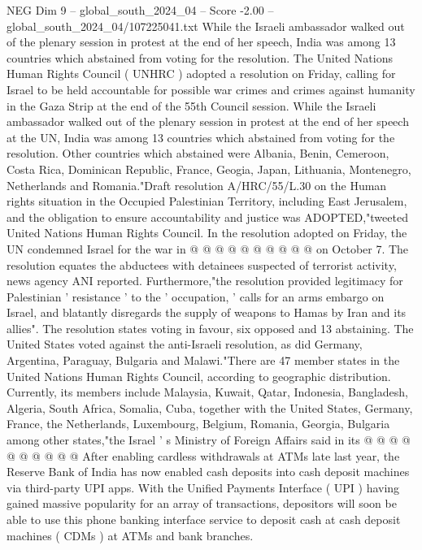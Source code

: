 \begin{textsample}{NEG Dim 9 – global\_south\_2024\_04 – Score -2.00 – global\_south\_2024\_04/107225041.txt}  \label{ex:f9_neg_376}
While the Israeli ambassador walked out of the plenary session in protest at the end of her speech, India was among 13 countries which abstained from voting for the resolution.
The United Nations Human Rights Council ( UNHRC ) adopted a resolution on Friday, calling for Israel to be held accountable for possible war crimes and crimes against humanity in the Gaza Strip at the end of the 55th Council session.
While the Israeli ambassador walked out of the plenary session in protest at the end of her speech at the UN, India was among 13 countries which abstained from voting for the resolution.
Other countries which abstained were Albania, Benin, Cemeroon, Costa Rica, Dominican Republic, France, Geogia, Japan, Lithuania, Montenegro, Netherlands and Romania."Draft resolution A/HRC/55/L.30 on the Human rights situation in the Occupied Palestinian Territory, including East Jerusalem, and the obligation to ensure accountability and justice was ADOPTED,"tweeted United Nations Human Rights Council.
In the resolution adopted on Friday, the UN condemned Israel for the war in @ @ @ @ @ @ @ @ @ @ on October 7.
The resolution equates the abductees with detainees suspected of terrorist activity, news agency ANI reported.
Furthermore,"the resolution provided legitimacy for Palestinian ' resistance ' to the ' occupation, ' calls for an arms embargo on Israel, and blatantly disregards the supply of weapons to Hamas by Iran and its allies".
The resolution states voting in favour, six opposed and 13 abstaining.
The United States voted against the anti-Israeli resolution, as did Germany, Argentina, Paraguay, Bulgaria and Malawi."There are 47 member states in the United Nations Human Rights Council, according to geographic distribution.
Currently, its members include Malaysia, Kuwait, Qatar, Indonesia, Bangladesh, Algeria, South Africa, Somalia, Cuba, together with the United States, Germany, France, the Netherlands, Luxembourg, Belgium, Romania, Georgia, Bulgaria among other states,"the Israel ' s Ministry of Foreign Affairs said in its @ @ @ @ @ @ @ @ @ @ After enabling cardless withdrawals at ATMs late last year, the Reserve Bank of India has now enabled cash deposits into cash deposit machines via third-party UPI apps.
With the Unified Payments Interface ( UPI ) having gained massive popularity for an array of transactions, depositors will soon be able to use this phone banking interface service to deposit cash at cash deposit machines ( CDMs ) at ATMs and bank branches.

\end{textsample}
